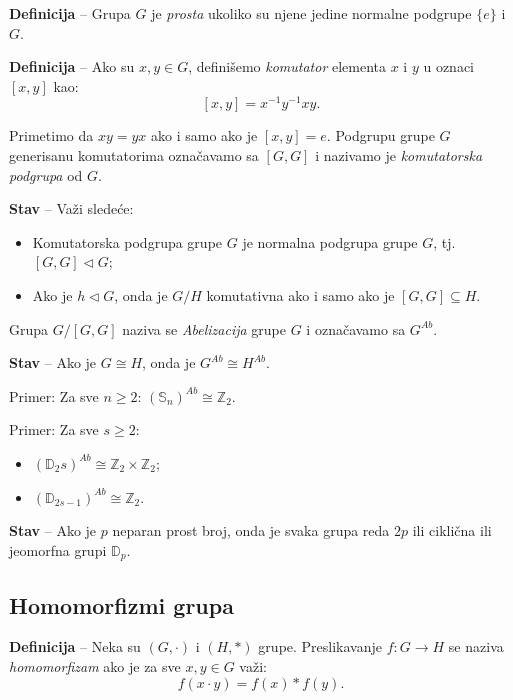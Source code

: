 \documentclass[a4paper,12pt]{article}
\newcommand{\f}[1]{\(#1\)}
\begin{document}
\medskip
\textbf{Definicija} -- Grupa \f{G} je \emph{prosta} ukoliko su njene jedine normalne podgrupe \f{\{e\}} i \f{G}.

\medskip
\textbf{Definicija} -- Ako su \f{x, y \in G}, definišemo \emph{komutator} elementa \f{x} i \f{y} u oznaci \f{[x, y]} kao:
\[
  [x, y] = x^{-1}y^{-1}xy.
\]  

Primetimo da \f{xy = yx} ako i samo ako je \f{[x, y] = e}. Podgrupu grupe \f{G} generisanu
komutatorima označavamo sa \f{[G, G]} i nazivamo je \emph{komutatorska podgrupa} od \f{G}.

\bigskip
\textbf{Stav} -- Važi sledeće:
\begin{itemize}
  \item Komutatorska podgrupa grupe \f{G} je normalna podgrupa grupe \f{G}, tj. \f{[G, G] \triangleleft G};
  \item Ako je \f{h \triangleleft G}, onda je \f{G/H} komutativna ako i samo ako je \f{[G, G] \subseteq H}.
\end{itemize}

\bigskip

Grupa \f{G/[G, G]} naziva se \emph{Abelizacija} grupe \f{G} i označavamo sa \f{G^{Ab}}.

\smallskip
\textbf{Stav} -- Ako je \f{G \cong H}, onda je \f{G^{Ab} \cong H^{Ab}}.

\smallskip

Primer: Za sve \f{n \geq 2}: \f{(\mathbb{S}_n)^{Ab} \cong \mathbb{Z}_2}.

Primer: Za sve \f{s \geq 2}:
\begin{itemize}
  \item \f{(\mathbb{D}_2s)^{Ab} \cong \mathbb{Z}_2 \times \mathbb{Z}_2};
  \item \f{(\mathbb{D}_{2s-1})^{Ab} \cong \mathbb{Z}_2}.
\end{itemize}

\bigskip

\textbf{Stav} -- Ako je \f{p} neparan prost broj, onda je svaka grupa reda \f{2p} ili ciklična ili jeomorfna grupi \f{\mathbb{D}_p}.

\subsection{Homomorfizmi grupa}

\textbf{Definicija} --  Neka su \f{(G, \cdot)} i \f{(H, *)} grupe. Preslikavanje \f{f : G \rightarrow H} se naziva \emph{homomorfizam} ako je za sve \f{x, y \in G} važi:
\[
  f(x \cdot y) = f(x) * f(y).
\]
\end{document}
